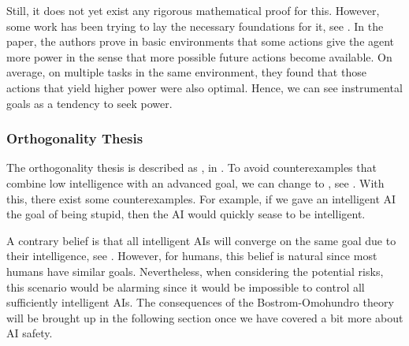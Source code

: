\documentclass[12pt,A4]{report}
\theoremstyle{definition}
\begin{document}

Still, it does not yet exist any rigorous mathematical proof for this. However, some work has been trying to lay the necessary foundations for it, see \citet{Turner19a}. In the paper, the authors prove in basic environments that some actions give the agent more power in the sense that more possible future actions become available. On average, on multiple tasks in the same environment, they found that those actions that yield higher power were also optimal. Hence, we can see instrumental goals as a tendency to seek power.


\subsubsection{Orthogonality Thesis}
The orthogonality thesis is described as , in \citet{Bostrom12}. To avoid counterexamples that combine low intelligence with an advanced goal, we can change  to , see \citet{Haggstrom19}. With this, there exist some counterexamples. For example, if we gave an intelligent AI the goal of being stupid, then the AI would quickly sease to be intelligent.

A contrary belief is that all intelligent AIs will converge on the same goal due to their intelligence, see \citet{MullerCannon}. However, for humans, this belief is natural since most humans have similar goals. Nevertheless, when considering the potential risks, this scenario would be alarming since it would be impossible to control all sufficiently intelligent AIs. The consequences of the Bostrom-Omohundro theory will be brought up in the following section once we have covered a bit more about AI safety.

\end{document}

